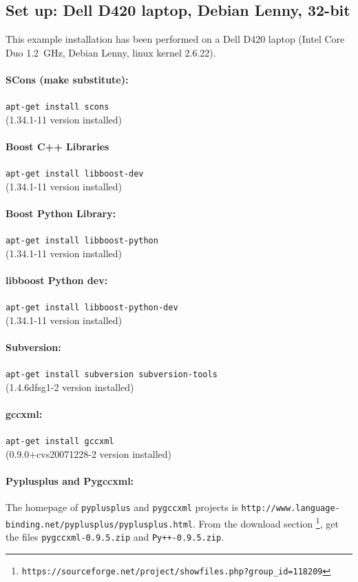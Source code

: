 \documentclass[12pt,a4paper]{article}
\begin{document}
\subsection{Set up: Dell D420 laptop, Debian Lenny, 32-bit}
This example installation has been performed on a Dell D420 laptop (Intel
Core Duo 1.2~GHz, Debian Lenny, linux kernel 2.6.22).

\paragraph{SCons (make substitute):} {\tt apt-get install scons} \\
(1.34.1-11 version installed)


\paragraph{Boost C++ Libraries} {\tt apt-get install libboost-dev} \\
(1.34.1-11 version installed)


\paragraph{Boost Python Library:} {\tt apt-get install libboost-python} \\
(1.34.1-11 version installed)


\paragraph{libboost Python dev:} {\tt apt-get install libboost-python-dev} \\
(1.34.1-11 version installed)

\paragraph{Subversion:} {\tt apt-get install subversion subversion-tools} \\
(1.4.6dfsg1-2 version installed)

\paragraph{gccxml:} {\tt apt-get install gccxml} \\
(0.9.0+cvs20071228-2 version installed)

\paragraph{Pyplusplus and Pygccxml: }
The homepage of {\tt pyplusplus} and {\tt pygccxml} projects is 
{\tt http://www.language-binding.net/pyplusplus/pyplusplus.html}. From the
download section \footnote{\tt https://sourceforge.net/project/showfiles.php?group\_id=118209}, 
get the files {\tt pygccxml-0.9.5.zip} and {\tt Py++-0.9.5.zip}.
\end{document}
